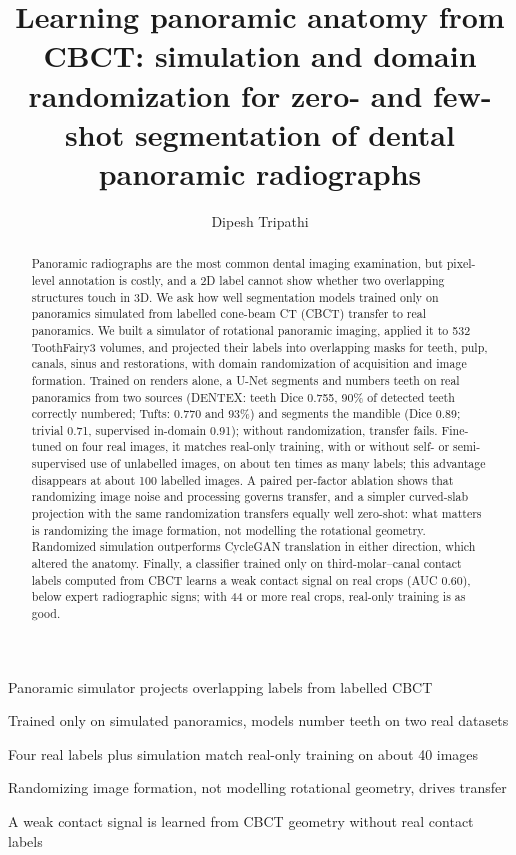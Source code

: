 \documentclass[preprint,12pt]{elsarticle}
\begin{document}
\begin{frontmatter}

\title{Learning panoramic anatomy from CBCT: simulation and domain randomization for zero- and few-shot segmentation of dental panoramic radiographs}

\author[usd]{Dipesh Tripathi}

\begin{abstract}
Panoramic radiographs are the most common dental imaging examination, but pixel-level annotation is costly, and a 2D
label cannot show whether two overlapping structures touch in 3D. We ask how well segmentation models trained only on
panoramics simulated from labelled cone-beam CT (CBCT) transfer to real panoramics. We built a simulator of rotational
panoramic imaging, applied it to 532 ToothFairy3 volumes, and projected their labels into overlapping masks
for teeth, pulp, canals, sinus and restorations, with domain randomization of acquisition and image formation. Trained
on renders alone, a U-Net segments and numbers teeth on real panoramics from two sources (DENTEX: teeth Dice 0.755, 90\%
of detected teeth correctly numbered; Tufts: 0.770 and 93\%) and segments the mandible (Dice 0.89; trivial
0.71, supervised in-domain 0.91); without randomization, transfer fails. Fine-tuned on four real images, it matches real-only training, with or
without self- or semi-supervised use of unlabelled images, on about ten times as many labels; this advantage disappears at about
100 labelled images. A paired per-factor ablation shows that randomizing image noise and processing governs transfer,
and a simpler curved-slab projection with the same randomization transfers equally well zero-shot: what matters is
randomizing the image formation, not modelling the rotational geometry. Randomized
simulation outperforms CycleGAN translation in either direction, which altered the anatomy. Finally, a classifier trained only on
third-molar--canal contact labels computed from CBCT learns a weak contact signal on real crops (AUC 0.60), below expert
radiographic signs; with 44 or more real crops, real-only training is as good.
\end{abstract}

\begin{highlights}
\item Panoramic simulator projects overlapping labels from labelled CBCT
\item Trained only on simulated panoramics, models number teeth on two real datasets
\item Four real labels plus simulation match real-only training on about 40 images
\item Randomizing image formation, not modelling rotational geometry, drives transfer
\item A weak contact signal is learned from CBCT geometry without real contact labels
\end{highlights}


\end{frontmatter}
\end{document}

